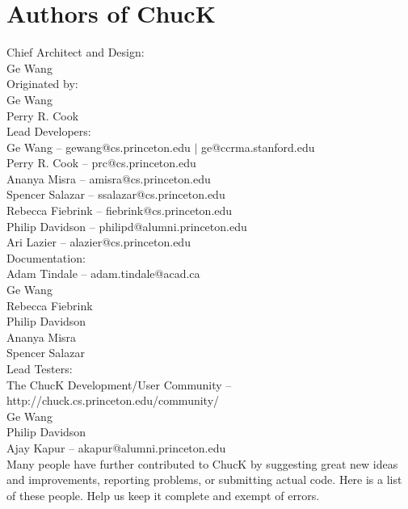 \newpage
\section{Authors of ChucK}

Chief Architect and Design:\\
\authtab Ge Wang\\

Originated by:\\
\authtab Ge Wang\\
\authtab Perry R. Cook\\

Lead Developers:\\
\authtab Ge Wang -- gewang@cs.princeton.edu $|$ ge@ccrma.stanford.edu\\
\authtab Perry R. Cook -- prc@cs.princeton.edu\\
\authtab Ananya Misra -- amisra@cs.princeton.edu\\
\authtab Spencer Salazar -- ssalazar@cs.princeton.edu\\
\authtab Rebecca Fiebrink -- fiebrink@cs.princeton.edu\\
\authtab Philip Davidson -- philipd@alumni.princeton.edu\\
\authtab Ari Lazier -- alazier@cs.princeton.edu\\

Documentation:\\
\authtab Adam Tindale -- adam.tindale@acad.ca\\
\authtab Ge Wang\\
\authtab Rebecca Fiebrink\\
\authtab Philip Davidson\\
\authtab Ananya Misra\\
\authtab Spencer Salazar\\

Lead Testers:\\
\authtab The ChucK Development/User Community -- http://chuck.cs.princeton.edu/community/\\
\authtab Ge Wang\\
\authtab Philip Davidson\\
\authtab Ajay Kapur -- akapur@alumni.princeton.edu\\


Many people have further contributed to ChucK by suggesting great new ideas and improvements, reporting problems, or submitting actual code. Here is a list of these people.  Help us keep it complete and exempt of errors.

